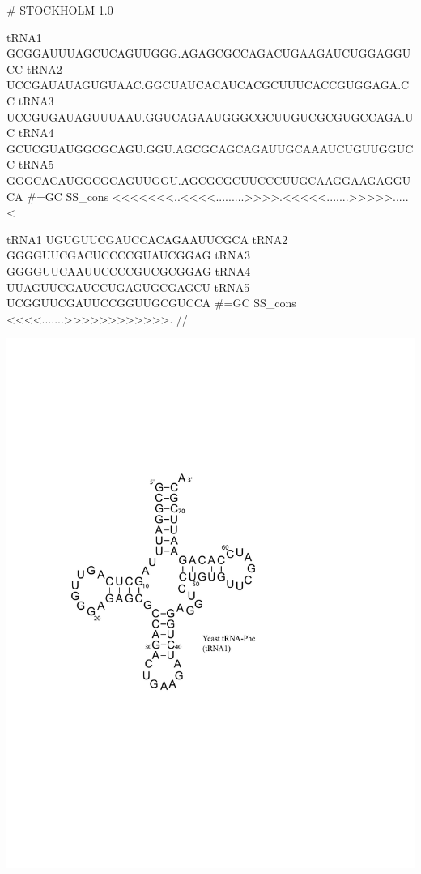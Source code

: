 \vspace{1em}
\begin{minipage}{4.7in}
\begin{sreoutput}[xleftmargin=0em]
# STOCKHOLM 1.0

tRNA1             GCGGAUUUAGCUCAGUUGGG.AGAGCGCCAGACUGAAGAUCUGGAGGUCC
tRNA2             UCCGAUAUAGUGUAAC.GGCUAUCACAUCACGCUUUCACCGUGGAGA.CC
tRNA3             UCCGUGAUAGUUUAAU.GGUCAGAAUGGGCGCUUGUCGCGUGCCAGA.UC
tRNA4             GCUCGUAUGGCGCAGU.GGU.AGCGCAGCAGAUUGCAAAUCUGUUGGUCC
tRNA5             GGGCACAUGGCGCAGUUGGU.AGCGCGCUUCCCUUGCAAGGAAGAGGUCA
#=GC SS_cons      <<<<<<<..<<<<.........>>>>.<<<<<.......>>>>>.....<

tRNA1             UGUGUUCGAUCCACAGAAUUCGCA
tRNA2             GGGGUUCGACUCCCCGUAUCGGAG
tRNA3             GGGGUUCAAUUCCCCGUCGCGGAG
tRNA4             UUAGUUCGAUCCUGAGUGCGAGCU
tRNA5             UCGGUUCGAUUCCGGUUGCGUCCA
#=GC SS_cons      <<<<.......>>>>>>>>>>>>.
//
\end{sreoutput}
\end{minipage}
\begin{minipage}{1.5in}
\includegraphics[scale=0.4]{Figures/trna1-DF6280}
\end{minipage}
\vspace{1em}

